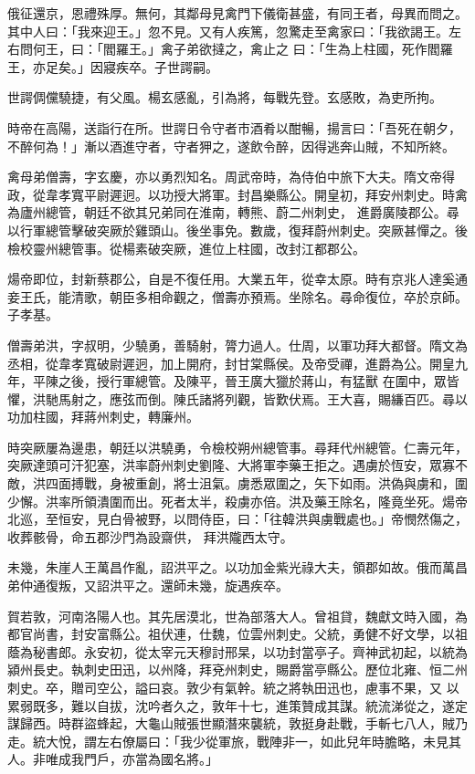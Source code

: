 \begin{pinyinscope}
 俄征還京，恩禮殊厚。無何，其鄰母見禽門下儀衛甚盛，有同王者，母異而問之。其中人曰：「我來迎王。」忽不見。又有人疾篤，忽驚走至禽家曰：「我欲謁王。左右問何王，曰：「閻羅王。」禽子弟欲撻之，禽止之
 曰：「生為上柱國，死作閻羅王，亦足矣。」因寢疾卒。子世諤嗣。



 世諤倜儻驍捷，有父風。楊玄感亂，引為將，每戰先登。玄感敗，為吏所拘。



 時帝在高陽，送詣行在所。世諤日令守者市酒肴以酣暢，揚言曰：「吾死在朝夕，不醉何為！」漸以酒進守者，守者狎之，遂飲令醉，因得逃奔山賊，不知所終。



 禽母弟僧壽，字玄慶，亦以勇烈知名。周武帝時，為侍伯中旅下大夫。隋文帝得政，從韋孝寬平尉遲迥。以功授大將軍。封昌樂縣公。開皇初，拜安州刺史。時禽為廬州總管，朝廷不欲其兄弟同在淮南，轉熊、蔚二州刺史，
 進爵廣陵郡公。尋以行軍總管擊破突厥於雞頭山。後坐事免。數歲，復拜蔚州刺史。突厥甚憚之。後檢校靈州總管事。從楊素破突厥，進位上柱國，改封江都郡公。



 煬帝即位，封新蔡郡公，自是不復任用。大業五年，從幸太原。時有京兆人達奚通妾王氏，能清歌，朝臣多相命觀之，僧壽亦預焉。坐除名。尋命復位，卒於京師。子孝基。



 僧壽弟洪，字叔明，少驍勇，善騎射，膂力過人。仕周，以軍功拜大都督。隋文為丞相，從韋孝寬破尉遲迥，加上開府，封甘棠縣侯。及帝受禪，進爵為公。開皇九年，平陳之後，授行軍總管。及陳平，晉王廣大獵於蔣山，有猛獸
 在圍中，眾皆懼，洪馳馬射之，應弦而倒。陳氏諸將列觀，皆歎伏焉。王大喜，賜縑百匹。尋以功加柱國，拜蔣州刺史，轉廉州。



 時突厥屢為邊患，朝廷以洪驍勇，令檢校朔州總管事。尋拜代州總管。仁壽元年，突厥達頭可汗犯塞，洪率蔚州刺史劉隆、大將軍李藥王拒之。遇虜於恆安，眾寡不敵，洪四面搏戰，身被重創，將士沮氣。虜悉眾圍之，矢下如雨。洪偽與虜和，圍少懈。洪率所領潰圍而出。死者太半，殺虜亦倍。洪及藥王除名，隆竟坐死。煬帝北巡，至恒安，見白骨被野，以問侍臣，曰：「往韓洪與虜戰處也。」帝憫然傷之，收葬骸骨，命五郡沙門為設齋供，
 拜洪隴西太守。



 未幾，朱崖人王萬昌作亂，詔洪平之。以功加金紫光祿大夫，領郡如故。俄而萬昌弟仲通復叛，又詔洪平之。還師未幾，旋遇疾卒。



 賀若敦，河南洛陽人也。其先居漠北，世為部落大人。曾祖貸，魏獻文時入國，為都官尚書，封安富縣公。祖伏連，仕魏，位雲州刺史。父統，勇健不好文學，以祖蔭為秘書郎。永安初，從太宰元天穆討邢杲，以功封當亭子。齊神武初起，以統為潁州長史。執刺史田迅，以州降，拜兗州刺史，賜爵當亭縣公。歷位北雍、恒二州刺史。卒，贈司空公，謚曰哀。敦少有氣幹。統之將執田迅也，慮事不果，又
 以累弱既多，難以自拔，沈吟者久之，敦年十七，進策贊成其謀。統流涕從之，遂定謀歸西。時群盜蜂起，大龜山賊張世顯潛來襲統，敦挺身赴戰，手斬七八人，賊乃走。統大悅，謂左右僚屬曰：「我少從軍旅，戰陣非一，如此兒年時膽略，未見其人。非唯成我門戶，亦當為國名將。」




\end{pinyinscope}
